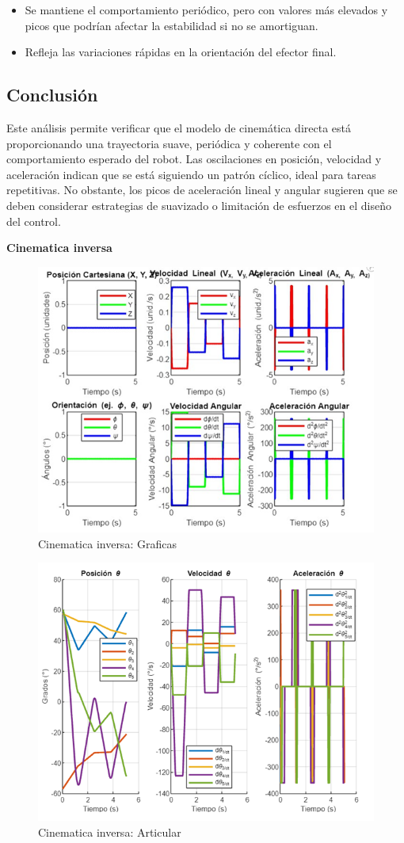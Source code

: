 \begin{itemize}
	\item Se mantiene el comportamiento periódico, pero con valores más elevados y picos que podrían afectar la estabilidad si no se amortiguan.
	\item Refleja las variaciones rápidas en la orientación del efector final.
\end{itemize}


\subsection*{Conclusión}
Este análisis permite verificar que el modelo de cinemática directa está proporcionando una trayectoria suave, periódica y coherente con el comportamiento esperado del robot. Las oscilaciones en posición, velocidad y aceleración indican que se está siguiendo un patrón cíclico, ideal para tareas repetitivas. No obstante, los picos de aceleración lineal y angular sugieren que se deben considerar estrategias de suavizado o limitación de esfuerzos en el diseño del control.

\textbf{Cinematica inversa}


\begin{figure} [h]
	\centering
	\includegraphics[width=0.7\linewidth]{img/cinematicainvgraficas}
	\caption{Cinematica inversa: Graficas}
	\label{fig:cinematicainvgraficas}
\end{figure}

\begin{figure} [h]
	\centering
	\includegraphics[width=0.7\linewidth]{img/cinematicainvarticular}
	\caption{Cinematica inversa: Articular}
	\label{fig:cinematicainvarticular}
\end{figure}

